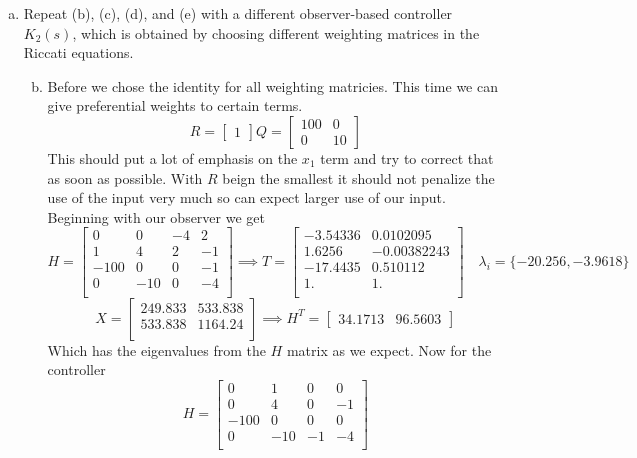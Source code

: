 \documentclass{article}
\begin{document}
\begin{enumerate}[(a)]
\item Repeat (b), (c), (d), and (e) with a different observer-based controller $K_2(s)$, which is obtained by choosing different weighting matrices in the Riccati equations.
\newline
\begin{enumerate}[(a)]
\setcounter{enumii}{1}
\item Before we chose the identity for all weighting matricies.
This time we can give preferential weights to certain terms.
$$
R =
\begin{bmatrix} 1 \end{bmatrix}
Q =
\begin{bmatrix} 100 & 0 \\ 0 & 10 \end{bmatrix}
$$
This should put a lot of emphasis on the $x_1$ term and try to correct that as soon as possible.
With $R$ beign the smallest it should not penalize the use of the input very much so can expect larger use of our input.
Beginning with our observer we get
$$
H =
\begin{bmatrix}
0 & 0 & -4 & 2 \\
1 & 4 & 2 & -1 \\
-100 & 0 & 0 & -1 \\
0 & -10 & 0 & -4 \\
\end{bmatrix}
\implies
T =
\begin{bmatrix}
-3.54336 & 0.0102095 \\
1.6256 & -0.00382243 \\
-17.4435 & 0.510112 \\
1. & 1. \\
\end{bmatrix}
\quad \lambda_i = \{-20.256, -3.9618\}
$$
$$
X =
\begin{bmatrix}
249.833 & 533.838 \\
 533.838 & 1164.24 \\
\end{bmatrix}
\implies
H^T = \begin{bmatrix} 34.1713 & 96.5603 \end{bmatrix}
$$
Which has the eigenvalues from the $H$ matrix as we expect.
\newline
Now for the controller
$$
H =
\begin{bmatrix}
0 & 1 & 0 & 0 \\
0 & 4 & 0 & -1 \\
-100 & 0 & 0 & 0 \\
0 & -10 & -1 & -4 \\

\end{bmatrix}$$
\end{enumerate}
\end{enumerate}
\end{document}
